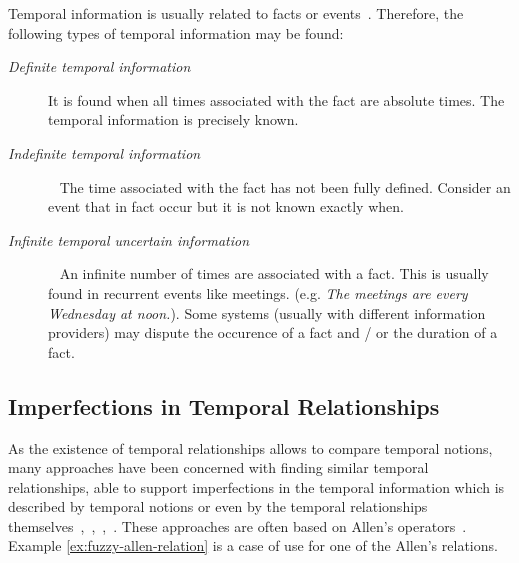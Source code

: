 Temporal information is usually related to facts or events~\cite{Chountas2000}. Therefore, the following types of temporal information may be found:

\begin{description}
\item[\emph{Definite temporal information}]
It is found when all times associated with the fact are absolute times. The temporal information is precisely known.

\item[\emph{Indefinite temporal information}]~\cite{Dey1996}
The time associated with the fact has not been fully defined. Consider an event that in fact occur but it is not known exactly when.

\item[\emph{Infinite temporal uncertain information}]~\cite{Kabanza1990}
An infinite number of times are associated with a fact. This is usually found in recurrent events like meetings. (e.g. \emph{The meetings are every Wednesday at noon.}). Some systems (usually with different information providers) may dispute the occurence of a fact and / or the duration of a fact. 
\end{description}


\subsection{Imperfections in Temporal Relationships}
As the existence of temporal relationships allows to compare temporal notions, many approaches have been concerned with finding similar temporal relationships, able to support imperfections in the temporal information which is described by temporal notions or even by the temporal relationships themselves~\cite{ohlbach2004},~\cite{nagypal2003},~\cite{schockaert08},~\cite{Dubois:jucs_9_9:fuzziness_and_uncertainty_in}. These approaches are often based on Allen's operators~\cite{Allen83}. Example \ref{ex:fuzzy-allen-relation} is a case of use for one of the Allen's relations.


